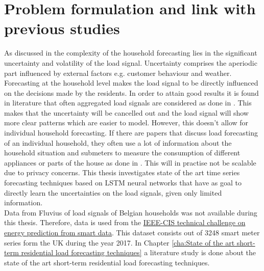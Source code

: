 \section{Problem formulation and link with previous studies}
As discussed in \cite{Shi2018} the complexity of the household forecasting lies in the significant uncertainty and volatility of the load signal. Uncertainty comprises the aperiodic part influenced by external factors e.g. customer behaviour and weather. Forecasting at the household level makes the load signal to be directly influenced on the decisions made by the residents. In order to attain good results it is found in literature that often aggregated load signals are considered as done in \cite{loadforecastingmoor}. This makes that the uncertainty will be cancelled out and the load signal will show more clear patterns which are easier to model. However, this doesn't allow for individual household forecasting. If there are papers that discuss load forecasting of an individual household, they often use a lot of information about the household situation and submeters to measure the consumption of different appliances or parts of the house as done in \cite{Kim2019}. This will in practise not be scalable due to privacy concerns. This thesis investigates state of the art time series forecasting techniques based on LSTM neural networks that have as goal to directly learn the uncertainties  on the load signals, given only limited information.\\

Data from Fluvius of load signals of Belgian households was not available during this thesis. Therefore, data is used from the \href{https://ieee-dataport.org/competitions/ieee-cis-technical-challenge-energy-prediction-smart-meter-data}{IEEE-CIS technical challenge on energy prediction from smart data}. This dataset consists out of 3248 smart meter series form the UK during the year 2017. In Chapter \ref{cha:State of the art short-term residential load forecasting techniques} a literature study is done about the state of the art short-term residential load forecasting techniques. 


